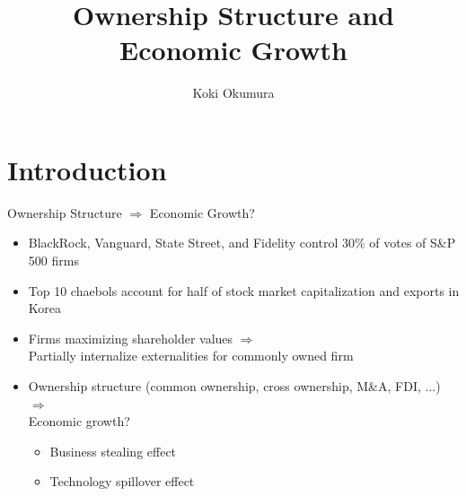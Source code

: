 \documentclass[
  aspectratio=169,  %
  handout           %
]{beamer}
\title{Ownership Structure and Economic Growth}
\author{Koki Okumura}
\institute{UCLA}
\date{}
\theoremstyle{plain}
\begin{document}
\begin{frame}
  \titlepage
\end{frame}

\section{Introduction}

\begin{frame}{Ownership Structure $\Longrightarrow$ Economic Growth?}
  \label{intro} %
  \begin{itemize}
    \item BlackRock, Vanguard, State Street, and Fidelity control 30\% of votes
          of S\&P 500 firms \hfill \hyperlink{share}{}
    \item Top 10 chaebols account for half of stock market capitalization
          and exports in Korea
    \medskip{} \pause
    \item Firms maximizing shareholder values $\Longrightarrow$ \\
          Partially internalize externalities for commonly owned firm
    \medskip{} \pause
    \item Ownership structure (common ownership, cross ownership, M\&A, FDI, ...) $\Longrightarrow$ \\
          Economic growth?
          \begin{itemize}
            \item Business stealing effect
            \item Technology spillover effect
          \end{itemize}
  \end{itemize}
\end{frame}
\end{document}
